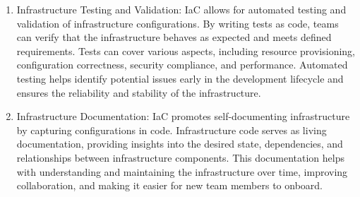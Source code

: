 \begin{enumerate}
    \item Infrastructure Testing and Validation: IaC allows for automated testing and validation of infrastructure configurations. By writing tests as code, teams can verify that the infrastructure behaves as expected and meets defined requirements. Tests can cover various aspects, including resource provisioning, configuration correctness, security compliance, and performance. Automated testing helps identify potential issues early in the development lifecycle and ensures the reliability and stability of the infrastructure.

    \item Infrastructure Documentation: IaC promotes self-documenting infrastructure by capturing configurations in code. Infrastructure code serves as living documentation, providing insights into the desired state, dependencies, and relationships between infrastructure components. This documentation helps with understanding and maintaining the infrastructure over time, improving collaboration, and making it easier for new team members to onboard.
\end{enumerate}

